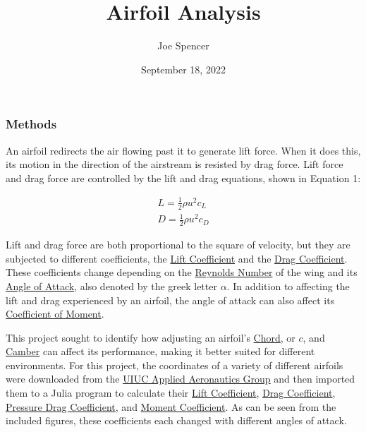 \documentclass{article}
\begin{document}
\author{Joe Spencer}
\title{Airfoil Analysis}
\date{September 18, 2022}
\maketitle

\subsubsection*{Methods}

An airfoil redirects the air flowing past it to generate lift force. When it does this, its motion in the direction of the airstream is resisted by drag force. Lift force and drag force are controlled by the lift and drag equations, shown in Equation 1:

\begin{equation} \label{eq:1}
\begin{aligned}
        	L = \frac{1}{2} \rho u^{2} c_{L} \\
        	D = \frac{1}{2} \rho u^{2} c_{D}
\end{aligned}
\end{equation}
	
Lift and drag force are both proportional to the square of velocity, but they are subjected to different coefficients, the \hyperlink{CL}{Lift Coefficient} and the \hyperlink{CD}{Drag Coefficient}. These coefficients change depending on the \hyperlink{Re}{Reynolds Number} of the wing and its \hyperlink{alpha}{Angle of Attack}, also denoted by the greek letter $\alpha$. In addition to affecting the lift and drag experienced by an airfoil, the angle of attack can also affect its \hyperlink{CM}{Coefficient of Moment}.\newline

This project sought to identify how adjusting an airfoil's \hyperlink{c}{Chord}, or $c$, and \hyperlink{Camber}{Camber} can affect its performance, making it better suited for different environments. For this project, the coordinates of a variety of different airfoils were downloaded from the \href{https://m-selig.ae.illinois.edu/ads.html}{UIUC Applied Aeronautics Group} and then imported them to a Julia program to calculate their \hyperlink{CL}{Lift Coefficient}, \hyperlink{CD}{Drag Coefficient}, \hyperlink{DP}{Pressure Drag Coefficient}, and \hyperlink{CM}{Moment Coefficient}. As can be seen from the included figures, these coefficients each changed with different angles of attack.\newline
\end{document}
